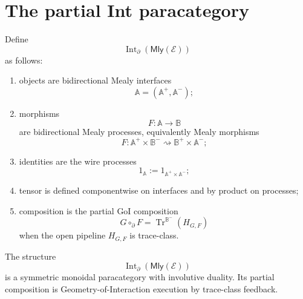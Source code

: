\section{The partial Int paracategory}
\label{sec:partial-int-paracategory}

\begin{definition}
\label{def:partial-int-mly}
Define
\[
\operatorname{Int}_{\partial}(\mathsf{Mly}(\mathcal E))
\]
as follows:
\begin{enumerate}
\item objects are bidirectional Mealy interfaces
\[
\mathbb A=(\mathbb A^+,\mathbb A^-);
\]
\item morphisms
\[
F:\mathbb A\to\mathbb B
\]
are bidirectional Mealy processes, equivalently Mealy morphisms
\[
F:\mathbb A^+\times\mathbb B^-
\rightsquigarrow
\mathbb B^+\times\mathbb A^-;
\]
\item identities are the wire processes
\[
1_{\mathbb A}:=1_{\mathbb A^+\times\mathbb A^-};
\]
\item tensor is defined componentwise on interfaces and by product on
processes;
\item composition is the partial GoI composition
\[
G\circ_{\partial}F
=
\operatorname{Tr}^{\mathbb B^-}(H_{G,F})
\]
when the open pipeline \(H_{G,F}\) is trace-class.
\end{enumerate}
\end{definition}

\begin{theorem}
\label{thm:partial-int-paracategory}
The structure
\[
\operatorname{Int}_{\partial}(\mathsf{Mly}(\mathcal E))
\]
is a symmetric monoidal paracategory with involutive duality.  Its partial
composition is Geometry-of-Interaction execution by trace-class feedback.
\end{theorem}

